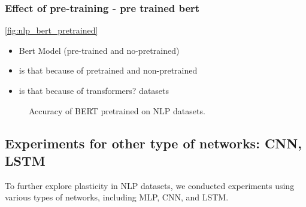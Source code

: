 \subsubsection{Effect of pre-training - pre trained bert}
\autoref{fig:nlp_bert_pretrained}
\begin{itemize}
    \item Bert Model (pre-trained and no-pretrained)
    \item is that because of pretrained and non-pretrained
    \item is that because of transformers?
    datasets %
\end{itemize}


\begin{figure}[htb!]
    \centering
    \caption{Accuracy of BERT pretrained on NLP datasets.}
    \label{fig:nlp_bert_pretrained}
\end{figure}



\subsection{Experiments for other type of networks: CNN, LSTM}

To further explore plasticity in NLP datasets, we conducted experiments using various types of networks, including MLP, CNN, and LSTM. 

